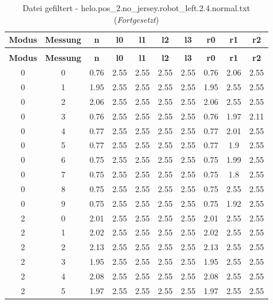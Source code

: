 \begin{longtable}{|c|c||c||c|c|c|c||c|c|c|}
	\caption{Datei gefiltert - helo.pos\_2.no\_jersey.robot\_left.2.4.normal.txt} \label{tab:helo.pos-2.no-jersey.robot-left.2.4.normal.txt} \\ \hline
	\textbf{Modus} & \textbf{Messung} & \textbf{n} & \textbf{l0} & \textbf{l1} & \textbf{l2} & \textbf{l3} & \textbf{r0} & \textbf{r1} & \textbf{r2}\\ \hline
	\endfirsthead
	\caption[]{Datei gefiltert - helo.pos\_2.no\_jersey.robot\_left.2.4.normal.txt (\emph{Fortgesetzt})} \\ \hline
	\textbf{Modus} & \textbf{Messung} & \textbf{n} & \textbf{l0} & \textbf{l1} & \textbf{l2} & \textbf{l3} & \textbf{r0} & \textbf{r1} & \textbf{r2}\\ \hline
	\endhead
	0 & 0 & 0.76 & 2.55 & 2.55 & 2.55 & 2.55 & 0.76 & 2.06 & 2.55 \\ \hline
	0 & 1 & 1.95 & 2.55 & 2.55 & 2.55 & 2.55 & 1.95 & 2.55 & 2.55 \\ \hline
	0 & 2 & 2.06 & 2.55 & 2.55 & 2.55 & 2.55 & 2.06 & 2.55 & 2.55 \\ \hline
	0 & 3 & 0.76 & 2.55 & 2.55 & 2.55 & 2.55 & 0.76 & 1.97 & 2.11 \\ \hline
	0 & 4 & 0.77 & 2.55 & 2.55 & 2.55 & 2.55 & 0.77 & 2.01 & 2.55 \\ \hline
	0 & 5 & 0.77 & 2.55 & 2.55 & 2.55 & 2.55 & 0.77 & 1.9 & 2.55 \\ \hline
	0 & 6 & 0.75 & 2.55 & 2.55 & 2.55 & 2.55 & 0.75 & 1.99 & 2.55 \\ \hline
	0 & 7 & 0.75 & 2.55 & 2.55 & 2.55 & 2.55 & 0.75 & 1.8 & 2.55 \\ \hline
	0 & 8 & 0.75 & 2.55 & 2.55 & 2.55 & 2.55 & 0.75 & 2.55 & 2.55 \\ \hline
	0 & 9 & 0.75 & 2.55 & 2.55 & 2.55 & 2.55 & 0.75 & 1.92 & 2.55 \\ \hline
	2 & 0 & 2.01 & 2.55 & 2.55 & 2.55 & 2.55 & 2.01 & 2.55 & 2.55 \\ \hline
	2 & 1 & 2.02 & 2.55 & 2.55 & 2.55 & 2.55 & 2.02 & 2.55 & 2.55 \\ \hline
	2 & 2 & 2.13 & 2.55 & 2.55 & 2.55 & 2.55 & 2.13 & 2.55 & 2.55 \\ \hline
	2 & 3 & 1.95 & 2.55 & 2.55 & 2.55 & 2.55 & 1.95 & 2.55 & 2.55 \\ \hline
	2 & 4 & 2.08 & 2.55 & 2.55 & 2.55 & 2.55 & 2.08 & 2.55 & 2.55 \\ \hline
	2 & 5 & 1.97 & 2.55 & 2.55 & 2.55 & 2.55 & 1.97 & 2.55 & 2.55 \\ \hline

\end{longtable}
